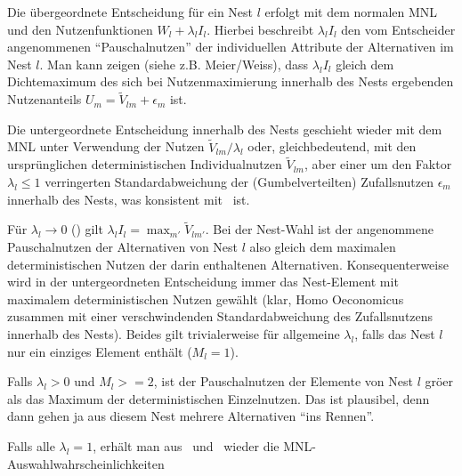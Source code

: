 \item Die \"ubergeordnete Entscheidung f\"ur ein Nest $l$ erfolgt mit
  dem normalen MNL und den Nutzenfunktionen $W_l+\lambda_l
  I_l$. Hierbei beschreibt $\lambda_l I_l$ den vom Entscheider
  angenommenen ``Pauschalnutzen'' der individuellen Attribute der 
  Alternativen im
  Nest $l$. Man kann zeigen (siehe z.B. Meier/Weiss), dass 
 $\lambda_l I_l$ gleich dem Dichtemaximum des sich bei
  Nutzenmaximierung innerhalb des Nests ergebenden
  Nutzenanteils 
$U_m=\tilde{V}_{lm}+\epsilon_{m}$  ist. 

\item Die untergeordnete Entscheidung innerhalb des Nests geschieht
  wieder mit dem MNL unter Verwendung der Nutzen $\tilde{V}_{lm}/\lambda_l$ oder,
  gleichbedeutend, mit den urspr\"unglichen deterministischen
  Individualnutzen $\tilde{V}_{lm}$, aber einer um den Faktor $\lambda_l\le 1$
  verringerten Standardabweichung der 
  (Gumbelverteilten) Zufallsnutzen $\epsilon_m$ innerhalb des
  Nests, was konsistent mit~ ist. 
 
\item F\"ur $\lambda_l \to 0$ () gilt $\lambda_l I_l=\max_{m'} \tilde{V}_{lm'}$.
  Bei der Nest-Wahl ist der angenommene Pauschalnutzen der
  Alternativen von Nest $l$  also gleich dem maximalen
  deterministischen Nutzen der darin 
  enthaltenen Alternativen. Konsequenterweise wird in der
  untergeordneten Entscheidung immer das Nest-Element mit maximalem
  deterministischen Nutzen gew\"ahlt  (klar, Homo Oeconomicus zusammen
  mit einer verschwindenden Standardabweichung des
  Zufallsnutzens innerhalb des Nests). Beides gilt
  trivialerweise f\"ur 
  allgemeine $\lambda_l$, falls das Nest $l$ nur ein einziges Element
  enth\"alt ($M_l=1$). 
\item Falls $\lambda_l>0$ und $M_l>=2$, ist der Pauschalnutzen der Elemente
  von Nest $l$ gr\"o\3er als das Maximum der deterministischen
  Einzelnutzen. Das 
  ist plausibel, denn dann gehen ja aus diesem Nest mehrere
  Alternativen ``ins Rennen''. 
\item Falls alle $\lambda_l=1$, erh\"alt man aus~
  und~ wieder die
  MNL-Auswahl\-wahr\-schein\-lich\-kei\-ten
\ei
  


